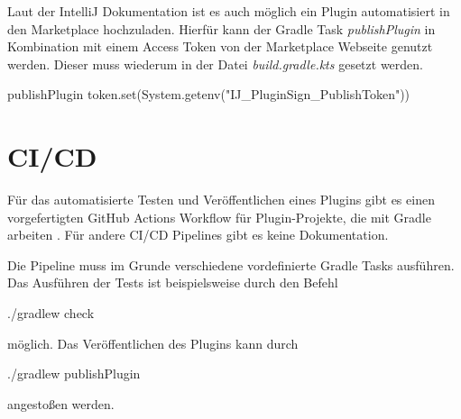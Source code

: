 Laut der IntelliJ Dokumentation ist es auch möglich ein
Plugin automatisiert in den Marketplace hochzuladen. Hierfür
kann der Gradle Task \emph{publishPlugin} in Kombination
mit einem Access Token von der Marketplace Webseite genutzt werden.
Dieser muss wiederum in der Datei \emph{build.gradle.kts} gesetzt werden.
\begin{JsCode}[numbers=none]
    publishPlugin {
        token.set(System.getenv("IJ_PluginSign_PublishToken"))
    }
\end{JsCode}

\section{CI/CD}
\label{sec:EntwicklungIntelliJ_CICD}

Für das automatisierte Testen und Veröffentlichen eines Plugins
gibt es einen vorgefertigten GitHub Actions Workflow für 
Plugin-Projekte, die mit Gradle arbeiten \cite{IntelliJGitHubBuildWorkflow}.
Für andere CI/CD Pipelines gibt es keine Dokumentation.

Die Pipeline muss im Grunde verschiedene vordefinierte Gradle Tasks
ausführen. Das Ausführen der Tests ist beispielsweise durch den Befehl
\begin{GenericCode}[numbers=none]
    ./gradlew check
\end{GenericCode}
möglich. Das Veröffentlichen des Plugins kann durch
\begin{GenericCode}[numbers=none]
    ./gradlew publishPlugin 
\end{GenericCode}
angestoßen werden. 
